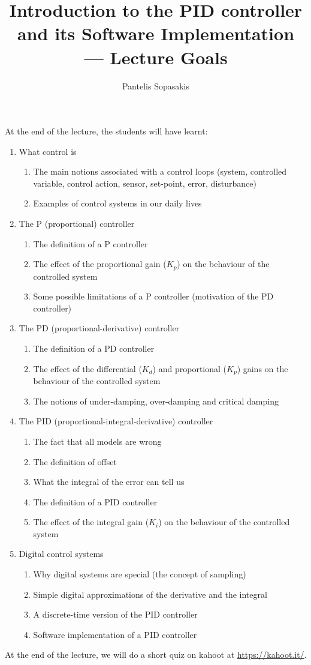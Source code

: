 \documentclass[a4paper,11pt,reqno]{amsart}
\title[PID: Lecture Goals]{Introduction to the PID controller and its Software Implementation --- Lecture Goals}
\author[P. Sopasakis]{Pantelis Sopasakis}
\numberwithin{equation}{section}
\theoremstyle{plain}
\begin{document}
\maketitle

At the end of the lecture, the students will have learnt:
\begin{enumerate}
 \item What control is
 \begin{enumerate}
  \item The main notions associated with a control loops (system, controlled 
        variable, control action, sensor, set-point, error, disturbance)
  \item Examples of control systems in our daily lives
 \end{enumerate}
 \item The P (proportional) controller
 \begin{enumerate}
  \item The definition of a P controller
  \item The effect of the proportional gain ($K_p$) on the behaviour of the controlled system
  \item Some possible limitations of a P controller (motivation of the PD controller)
 \end{enumerate}
 \item The PD (proportional-derivative) controller
 \begin{enumerate}
  \item The definition of a PD controller
  \item The effect of the differential ($K_d$) and proportional ($K_p$) gains on the 
        behaviour of the controlled system
  \item The notions of under-damping, over-damping and critical damping
 \end{enumerate}
 \item The PID (proportional-integral-derivative) controller
 \begin{enumerate}
  \item The fact that all models are wrong
  \item The definition of offset
  \item What the integral of the error can tell us
  \item The definition of a PID controller
  \item The effect of the integral gain ($K_i$) on the behaviour of the controlled system
 \end{enumerate}
 \item Digital control systems
 \begin{enumerate}
  \item Why digital systems are special (the concept of sampling)
  \item Simple digital approximations of the derivative and the integral
  \item A discrete-time version of the PID controller
  \item Software implementation of a PID controller
 \end{enumerate}
\end{enumerate}
At the end of the lecture, we will do a short quiz on kahoot at \href{https://kahoot.it/}{https://kahoot.it/}.
\end{document}
